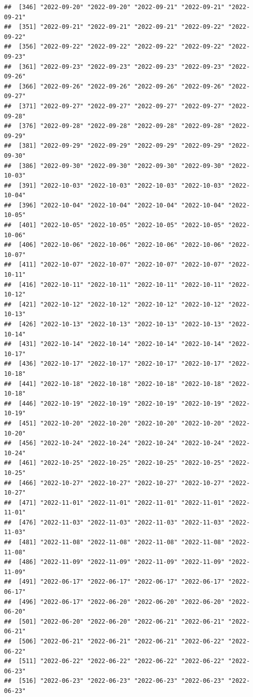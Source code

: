 \documentclass[
]{article}
\begin{document}
\begin{verbatim}
##  [346] "2022-09-20" "2022-09-20" "2022-09-21" "2022-09-21" "2022-09-21"
##  [351] "2022-09-21" "2022-09-21" "2022-09-21" "2022-09-22" "2022-09-22"
##  [356] "2022-09-22" "2022-09-22" "2022-09-22" "2022-09-22" "2022-09-23"
##  [361] "2022-09-23" "2022-09-23" "2022-09-23" "2022-09-23" "2022-09-26"
##  [366] "2022-09-26" "2022-09-26" "2022-09-26" "2022-09-26" "2022-09-27"
##  [371] "2022-09-27" "2022-09-27" "2022-09-27" "2022-09-27" "2022-09-28"
##  [376] "2022-09-28" "2022-09-28" "2022-09-28" "2022-09-28" "2022-09-29"
##  [381] "2022-09-29" "2022-09-29" "2022-09-29" "2022-09-29" "2022-09-30"
##  [386] "2022-09-30" "2022-09-30" "2022-09-30" "2022-09-30" "2022-10-03"
##  [391] "2022-10-03" "2022-10-03" "2022-10-03" "2022-10-03" "2022-10-04"
##  [396] "2022-10-04" "2022-10-04" "2022-10-04" "2022-10-04" "2022-10-05"
##  [401] "2022-10-05" "2022-10-05" "2022-10-05" "2022-10-05" "2022-10-06"
##  [406] "2022-10-06" "2022-10-06" "2022-10-06" "2022-10-06" "2022-10-07"
##  [411] "2022-10-07" "2022-10-07" "2022-10-07" "2022-10-07" "2022-10-11"
##  [416] "2022-10-11" "2022-10-11" "2022-10-11" "2022-10-11" "2022-10-12"
##  [421] "2022-10-12" "2022-10-12" "2022-10-12" "2022-10-12" "2022-10-13"
##  [426] "2022-10-13" "2022-10-13" "2022-10-13" "2022-10-13" "2022-10-14"
##  [431] "2022-10-14" "2022-10-14" "2022-10-14" "2022-10-14" "2022-10-17"
##  [436] "2022-10-17" "2022-10-17" "2022-10-17" "2022-10-17" "2022-10-18"
##  [441] "2022-10-18" "2022-10-18" "2022-10-18" "2022-10-18" "2022-10-18"
##  [446] "2022-10-19" "2022-10-19" "2022-10-19" "2022-10-19" "2022-10-19"
##  [451] "2022-10-20" "2022-10-20" "2022-10-20" "2022-10-20" "2022-10-20"
##  [456] "2022-10-24" "2022-10-24" "2022-10-24" "2022-10-24" "2022-10-24"
##  [461] "2022-10-25" "2022-10-25" "2022-10-25" "2022-10-25" "2022-10-25"
##  [466] "2022-10-27" "2022-10-27" "2022-10-27" "2022-10-27" "2022-10-27"
##  [471] "2022-11-01" "2022-11-01" "2022-11-01" "2022-11-01" "2022-11-01"
##  [476] "2022-11-03" "2022-11-03" "2022-11-03" "2022-11-03" "2022-11-03"
##  [481] "2022-11-08" "2022-11-08" "2022-11-08" "2022-11-08" "2022-11-08"
##  [486] "2022-11-09" "2022-11-09" "2022-11-09" "2022-11-09" "2022-11-09"
##  [491] "2022-06-17" "2022-06-17" "2022-06-17" "2022-06-17" "2022-06-17"
##  [496] "2022-06-17" "2022-06-20" "2022-06-20" "2022-06-20" "2022-06-20"
##  [501] "2022-06-20" "2022-06-20" "2022-06-21" "2022-06-21" "2022-06-21"
##  [506] "2022-06-21" "2022-06-21" "2022-06-21" "2022-06-22" "2022-06-22"
##  [511] "2022-06-22" "2022-06-22" "2022-06-22" "2022-06-22" "2022-06-23"
##  [516] "2022-06-23" "2022-06-23" "2022-06-23" "2022-06-23" "2022-06-23"

\end{verbatim}
\end{document}
